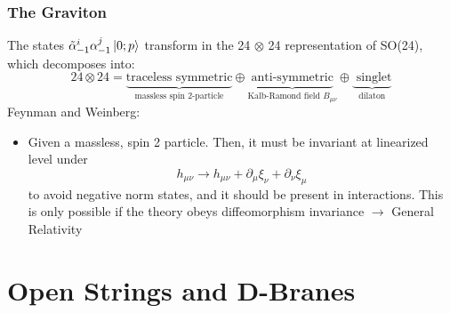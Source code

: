 \documentclass[aspectratio=169]{beamer}
\begin{document}
	\begin{frame}
		\frametitle{The Graviton}
		The states $\tilde{\alpha}^i_{-1}\alpha^j_{-1}\ket{0;p}$ transform in the 24 $\otimes$ 24 representation of SO(24), which decomposes into:
		\begin{equation*}
			24 \otimes 24 = \underbrace{\text{traceless symmetric}}_{\text{massless spin 2-particle}} \oplus \underbrace{\text{anti-symmetric}}_{\text{Kalb-Ramond field $B_{\mu\nu}$}} \oplus \underbrace{\text{ singlet}}_\text{{dilaton}}
		\end{equation*}
		Feynman and Weinberg:\\
		\begin{itemize}
			\item[] Given a massless, spin 2 particle. Then, it must be invariant at linearized level under
			\begin{equation*}
				h_{\mu\nu} \rightarrow h_{\mu\nu} + \partial_\mu\xi_\nu + \partial_\nu\xi_\mu
			\end{equation*}
			to avoid negative norm states, and it should be present in interactions. This is only possible if the theory obeys diffeomorphism invariance $\rightarrow$ General Relativity
		\end{itemize}
	\end{frame}

	\section{Open Strings and D-Branes}
	
\end{document}
